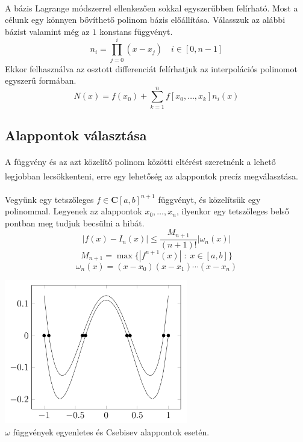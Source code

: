 \documentclass[12pt]{report}
\begin{document}
\paragraph{}
A bázis Lagrange módszerrel ellenkezően sokkal egyszerűbben felírható. Most a célunk egy könnyen bővíthető polinom bázis előállítása. Válasszuk az alábbi bázist valamint még az $1$ konstans függvényt.
$$
n_i = \prod_{j = 0}^{i}(x-x_j) \quad i \in [0, n - 1]
$$
Ekkor felhasználva az osztott differenciát felírhatjuk az interpolációs polinomot egyszerű formában.
$$
N(x) = f(x_0) + \sum_{k=1}^{n} f[x_0, \dots, x_k] n_i(x)
$$

\subsection{Alappontok választása}
\paragraph{}
A függvény és az azt közelítő polinom közötti eltérést szeretnénk a lehető legjobban lecsökkenteni, erre egy lehetőség az alappontok precíz megválasztása.\textsuperscript{\cite{numerikus-modszerek}}
\paragraph{}
Vegyünk egy tetszőleges $f \in \mathbf{C}[a,b]^{n+1}$ függvényt, és közelítsük egy polinommal. Legyenek az alappontok $x_0, \dots, x_n$, ilyenkor egy tetszőleges belső pontban meg tudjuk becsülni a hibát.
$$
|f(x) - I_n(x)| \leq \frac{M_{n+1}}{(n+1)!} |\omega_n(x)|
$$
$$
M_{n+1} = \max\{|f^{n+1}(x)| \; : \; x \in [a,b]\} 
$$
$$
\omega_n(x) = (x-x_0)(x-x_1)\cdots(x-x_n)
$$
\begin{center}
\includegraphics[width=8cm]{pics/chebyshev_and_even}\\
{\footnotesize $\omega$ függvények egyenletes és Csebisev alappontok esetén.}
\end{center}
\end{document}
